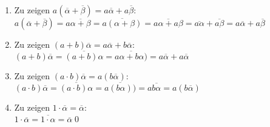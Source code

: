 \documentclass[sectionformat = aufgabe]{gadsescript}
\begin{document}
\begin{enumerate}[label=(S\arabic*)]
	\item Zu zeigen $ a\left( \overline{\alpha} + \overline{\beta}  \right) = a \overline{\alpha} + a \overline{\beta}  $:\\
		$ a \left( \overline{\alpha} + \overline{\beta}  \right) = a \overline{\alpha + \beta} = \overline{a(\alpha + \beta)} = \overline{a\alpha + a\beta} = \overline{a\alpha} + \overline{a\beta} = a \overline{\alpha} + a \overline{\beta}  $ 
	\item Zu zeigen $ (a + b) \overline{\alpha} = a \overline{\alpha} + b \overline{\alpha}  $:\\
		$ ( a + b) \overline{\alpha} = \overline{(a + b)\alpha} = \overline{a\alpha + b\alpha)} = a \overline{\alpha} + a \overline{\alpha}  $ 
	\item Zu zeigen $ (a \cdot  b) \overline{\alpha} = a \left( b \overline{\alpha}\right) $:\\
		$ ( a \cdot  b) \overline{\alpha} = \overline{(a \cdot  b)\alpha} = \overline{a\left(b\alpha\right) )} = a \overline{b \alpha} = a \left( b \overline{\alpha}  \right) $ 
	\item Zu zeigen $ 1 \cdot \overline{\alpha} = \overline{\alpha}  $:\\
		$ 1 \cdot \overline{\alpha} = \overline{1 \cdot \alpha} = \overline{\alpha}  $\qed
\end{enumerate}
\end{document}
